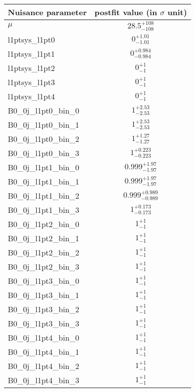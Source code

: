 
\begin{tabular}{|l|c|}
\hline
Nuisance parameter & postfit value (in $\sigma$ unit) \\\hline
$\mu$ & $28.5^{+108}_{-108}$ \\
l1ptsys\_l1pt0 & $0^{+1.01}_{-1.01}$ \\
l1ptsys\_l1pt1 & $0^{+0.984}_{-0.984}$ \\
l1ptsys\_l1pt2 & $0^{+1}_{-1}$ \\
l1ptsys\_l1pt3 & $0^{+1}_{-1}$ \\
l1ptsys\_l1pt4 & $0^{+1}_{-1}$ \\
B0\_0j\_l1pt0\_bin\_0 & $1^{+2.53}_{-2.53}$ \\
B0\_0j\_l1pt0\_bin\_1 & $1^{+2.53}_{-2.53}$ \\
B0\_0j\_l1pt0\_bin\_2 & $1^{+1.27}_{-1.27}$ \\
B0\_0j\_l1pt0\_bin\_3 & $1^{+0.223}_{-0.223}$ \\
B0\_0j\_l1pt1\_bin\_0 & $0.999^{+1.97}_{-1.97}$ \\
B0\_0j\_l1pt1\_bin\_1 & $0.999^{+1.97}_{-1.97}$ \\
B0\_0j\_l1pt1\_bin\_2 & $0.999^{+0.989}_{-0.989}$ \\
B0\_0j\_l1pt1\_bin\_3 & $1^{+0.173}_{-0.173}$ \\
B0\_0j\_l1pt2\_bin\_0 & $1^{+1}_{-1}$ \\
B0\_0j\_l1pt2\_bin\_1 & $1^{+1}_{-1}$ \\
B0\_0j\_l1pt2\_bin\_2 & $1^{+1}_{-1}$ \\
B0\_0j\_l1pt2\_bin\_3 & $1^{+1}_{-1}$ \\
B0\_0j\_l1pt3\_bin\_0 & $1^{+1}_{-1}$ \\
B0\_0j\_l1pt3\_bin\_1 & $1^{+1}_{-1}$ \\
B0\_0j\_l1pt3\_bin\_2 & $1^{+1}_{-1}$ \\
B0\_0j\_l1pt3\_bin\_3 & $1^{+1}_{-1}$ \\
B0\_0j\_l1pt4\_bin\_0 & $1^{+1}_{-1}$ \\
B0\_0j\_l1pt4\_bin\_1 & $1^{+1}_{-1}$ \\
B0\_0j\_l1pt4\_bin\_2 & $1^{+1}_{-1}$ \\
B0\_0j\_l1pt4\_bin\_3 & $1^{+1}_{-1}$ \\
\hline
\end{tabular}
